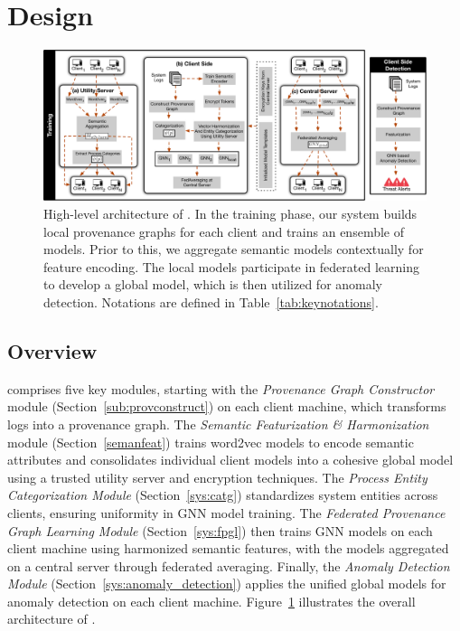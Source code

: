 \section{Design}
\label{sec:methodology}

\begin{figure}[t!]
  \centering
  \includegraphics[width=1\textwidth]{fig/archv3.pdf}
  \caption{High-level architecture of \Sys. In the training phase, our system builds local provenance graphs for each client and trains an ensemble of \gnnshort models. Prior to this, we aggregate semantic models contextually for feature encoding. The local \gnnshort models participate in federated learning to develop a global \gnnshort model, which is then utilized for anomaly detection. Notations are defined in Table~\ref{tab:keynotations}. }
  \vspace{-3ex}
  \label{fig:arch}
\end{figure}


\subsection{Overview}
\Sys comprises five key modules, starting with the \textit{Provenance Graph Constructor} module (Section~\ref{sub:provconstruct}) on each client machine, which transforms logs into a provenance graph. The \textit{Semantic Featurization \& Harmonization} module (Section~\ref{semanfeat}) trains word2vec models to encode semantic attributes and consolidates individual client models into a cohesive global model using a trusted utility server and encryption techniques. The \textit{Process Entity Categorization Module} (Section~\ref{sys:catg}) standardizes system entities across clients, ensuring uniformity in GNN model training. The \textit{Federated Provenance Graph Learning Module} (Section~\ref{sys:fpgl}) then trains GNN models on each client machine using harmonized semantic features, with the models aggregated on a central server through federated averaging. Finally, the \textit{Anomaly Detection Module} (Section~\ref{sys:anomaly_detection}) applies the unified global models for anomaly detection on each client machine. Figure~\ref{fig:arch} illustrates the overall architecture of \Sys.

